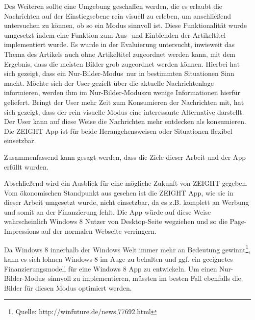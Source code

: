\documentclass[12pt,a4paper,bibtotoc,abstracton]{scrartcl}
\begin{document}
{{{Des Weiteren sollte eine Umgebung geschaffen werden, die es erlaubt die  Nachrichten auf der Einstiegsebene rein visuell zu erleben, um anschließend untersuchen zu können, ob so ein Modus sinnvoll ist. Diese Funktionalität wurde umgesetzt indem eine Funktion zum Aus- und Einblenden der Artikeltitel implementiert wurde. Es wurde in der Evaluierung untersucht, inwieweit das Thema des Artikels auch ohne Artikeltitel zugeordnet werden kann, mit dem Ergebnis, dass die meisten Bilder grob zugeordnet werden können. Hierbei hat sich gezeigt, dass ein \glqq Nur-Bilder-Modus\grqq\ nur in bestimmten Situationen Sinn macht. Möchte sich der User gezielt über die aktuelle Nachrichtenlage informieren, werden ihm im \glqq Nur-Bilder-Modus\grqq zu wenige Informationen hierfür geliefert. Bringt der User mehr Zeit zum Konsumieren der Nachrichten mit, hat sich gezeigt, dass der rein visuelle Modus eine interessante Alternative darstellt. Der User kann auf diese Weise die Nachrichten mehr entdecken als konsumieren. Die ZEIGHT App ist für beide Herangehensweisen oder Situationen flexibel einsetzbar.

Zusammenfassend kann gesagt werden, dass die Ziele dieser Arbeit und der App erfüllt wurden. 

Abschließend wird ein Ausblick für eine mögliche Zukunft von ZEIGHT gegeben. Vom ökonomischen Standpunkt aus gesehen ist die ZEIGHT App, wie sie in dieser Arbeit umgesetzt wurde, nicht einsetzbar, da es z.B. komplett an Werbung und somit an der Finanzierung fehlt. Die App würde auf diese Weise wahrscheinlich Windows 8 Nutzer von Desktop-Seite wegziehen und so die Page-Impressions auf der normalen Webseite verringern.

Da Windows 8 innerhalb der Windows Welt immer mehr an Bedeutung gewinnt\footnote{Quelle: http://winfuture.de/news,77692.html}, kann es sich lohnen Windows 8 im Auge zu behalten und ggf. ein geeignetes Finanzierungsmodell für eine Windows 8 App zu entwickeln. Um einen \glqq Nur-Bilder-Modus\grqq\ sinnvoll zu implementieren, müssten im besten Fall ebenfalls die Bilder für diesen Modus optimiert werden. 

\newpage
\begin{singlespace}
	
	
\end{singlespace}

\newpage
\appendix
{}
\thispagestyle{plain}



}}}
\end{document}
